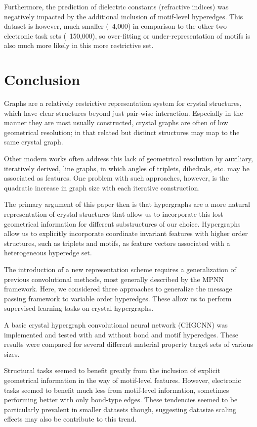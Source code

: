 \documentclass[10pt,a4paper]{article}
\begin{document}
Furthermore, the prediction of dielectric constants (refractive indices) was negatively impacted by the additional inclusion of motif-level hyperedges. This dataset is however, much smaller (~4,000) in comparison to the other two electronic task sets (~150,000), so over-fitting or under-representation of motifs is also much more likely in this more restrictive set.

\section{Conclusion}
Graphs are a relatively restrictive representation system for crystal structures, which have clear structures beyond just pair-wise interaction. Especially in the manner they are most usually constructed, crystal graphs are often of low geometrical resolution; in that related but distinct structures may map to the same crystal graph.

Other modern works often address this lack of geometrical resolution by auxiliary, iteratively derived, line graphs, in which angles of triplets, dihedrals, etc. may be associated as features. One problem with such approaches, however, is the quadratic increase in graph size with each iterative construction.

The primary argument of this paper then is that hypergraphs are a more natural representation of crystal structures that allow us to incorporate this lost geometrical information for different substructures of our choice.  Hypergraphs allow us to explicitly incorporate coordinate invariant features with higher order structures, such as triplets and motifs, as feature vectors associated with a heterogeneous hyperedge set.

The introduction of a new representation scheme requires a generalization of previous convolutional methods, most generally described by the MPNN framework. Here, we considered three approaches to generalize the message passing framework to variable order hyperedges. These allow us to perform supervised learning tasks on crystal hypergraphs.

A basic crystal hypergraph convolutional neural network (CHGCNN) was implemented and tested with and without bond and motif hyperedges. These results were compared for several different material property target sets of various sizes.

Structural tasks seemed to benefit greatly from the inclusion of explicit geometrical information in the way of motif-level features. However, electronic tasks seemed to benefit much less from motif-level information, sometimes performing better with only bond-type edges. These tendencies seemed to be particularly prevalent in smaller datasets though, suggesting datasize scaling effects may also be contribute to this trend.
\end{document}
